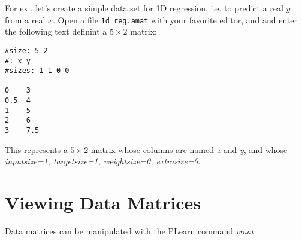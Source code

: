 \documentclass[11pt]{book}
\begin{document}
For ex., let's create a simple data set for 1D regression, i.e. to predict a real $y$ from a real $x$.
Open a file \verb!1d_reg.amat! with your favorite editor, and and enter the following text definint a 
$5 \times 2$ matrix:
\begin{verbatim}
#size: 5 2
#: x y     
#sizes: 1 1 0 0

0    3
0.5  4
1    5
2    6
3    7.5
\end{verbatim}

This represents a $5 \times 2$ matrix whose columns are named {\em x} and
{\em y}, and whose {\em inputsize=1, targetsize=1, weightsize=0, extrasize=0}.

\section{Viewing Data Matrices}

Data matrices can be manipulated with the PLearn command {\em vmat}:
\end{document}
